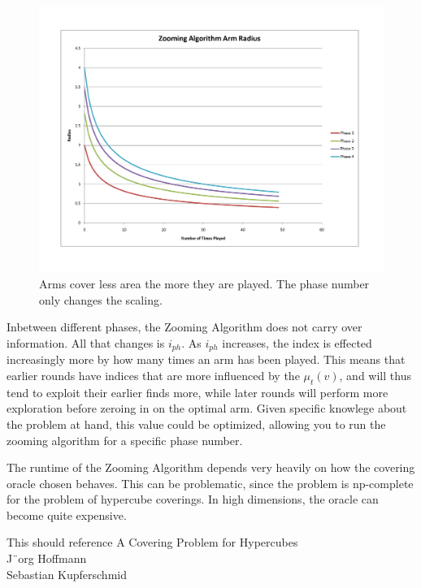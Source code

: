 \begin{figure}[!ht]
  \begin{center}
    \includegraphics[width=5 in]{figures/ZoomingRadius.png}
     \caption{Arms cover less area the more they are played. The phase number only changes the scaling.}
     \label{fig:zoomphase}
  \end{center}
\end{figure}

Inbetween different phases, the Zooming Algorithm does not carry
over information. All that changes is $i_{ph}$. As $i_{ph}$ increases,
the index is effected increasingly more by how many times an arm has
been played. This means that earlier rounds have indices that are more
influenced by the $\mu_t(v)$, and will thus tend to exploit their earlier
finds more, while later rounds will perform more exploration before zeroing
in on the optimal arm. Given specific knowlege about the problem at hand,
this value could be optimized, allowing you to run the zooming algorithm
for a specific phase number. 

The runtime of the Zooming Algorithm depends very heavily on how the
covering oracle chosen behaves. This can be problematic, since the problem
is np-complete for the problem of hypercube coverings. In high dimensions,
the oracle can become quite expensive.

This should reference A Covering Problem for Hypercubes\\J¨org Hoffmann\\Sebastian Kupferschmid

